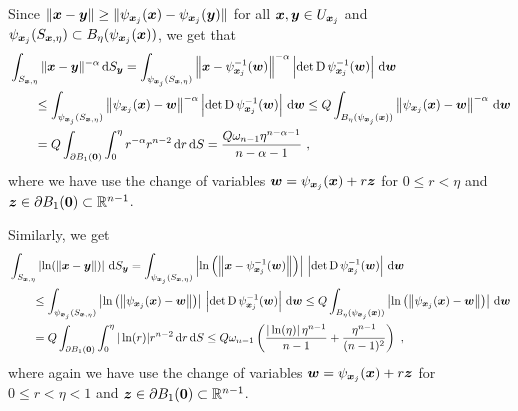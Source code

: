 Since $\displaystyle \|{\bm{x}}-{\bm{y}}\| 
\geq \|\psi_{{\bm{x}}_j}({\bm{x}}) - \psi_{{\bm{x}}_j}({\bm{y}})\|$ for all
$\displaystyle {\bm{x}},{\bm{y}} \in U_{{\bm{x}}_j}$ and
$\displaystyle \psi_{{\bm{x}}_j}(S_{{\bm{x}},\eta}) \subset
B_{\eta}(\psi_{{\bm{x}}_j}({\bm{x}}))$, we get that
\begin{align*}
&\int_{S_{{\bm{x}},\eta}} \|{\bm{x}}-{\bm{y}}\|^{-\alpha} \,\mathrm{d}{S}_{{\bm{y}}}
= \int_{\psi_{{\bm{x}}_j}(S_{{\bm{x}},\eta})}
\left\|{\bm{x}}-\psi_{{\bm{x}}_j}^{-1}({\bm{w}})\right\|^{-\alpha}
\left| \det \operatorname{D} \psi_{{\bm{x}}_j}^{-1}({\bm{w}})\right| \,\mathrm{d}{{\bm{w}}} \\
& \qquad
\leq \int_{\psi_{{\bm{x}}_j}(S_{{\bm{x}},\eta})}
\left\|\psi_{{\bm{x}}_j}({\bm{x}})-{\bm{w}}\right\|^{-\alpha}
\left| \det \operatorname{D} \psi_{{\bm{x}}_j}^{-1}({\bm{w}})\right| \,\mathrm{d}{{\bm{w}}}
\leq Q \int_{B_{\eta}(\psi_{{\bm{x}}_j}({\bm{x}}))}
\left\|\psi_{{\bm{x}}_j}({\bm{x}})-{\bm{w}}\right\|^{-\alpha} \,\mathrm{d}{{\bm{w}}} \\
&\qquad
= Q \int_{\partial B_1({\bm{0}})} \int_0^\eta r^{-\alpha}
r^{n-2} \,\mathrm{d}{r} \,\mathrm{d}{S}
= \frac{ Q \omega_{n-1} \eta^{n-\alpha-1}}{n-\alpha -1} \ ,
\end{align*}
where we have use the change of variables
${\bm{w}} = \psi_{{\bm{x}}_j}({\bm{x}}) + r {\bm{z}}$ for
$0 \leq r < \eta$ and ${\bm{z}} \in \partial B_1({\bm{0}}) \subset \mathbb{R}^{n-1}$.

Similarly, we get
\begin{align*}
&\int_{S_{{\bm{x}},\eta}} \left|\ln(\|{\bm{x}}-{\bm{y}}\|)\right| \,\mathrm{d}{S}_{{\bm{y}}}
= \int_{\psi_{{\bm{x}}_j}(S_{{\bm{x}},\eta})}
\left| \ln\left(\left\|{\bm{x}}
-\psi_{{\bm{x}}_j}^{-1}({\bm{w}})\right\|\right)\right| \,
\left| \det \operatorname{D} \psi_{{\bm{x}}_j}^{-1}({\bm{w}})\right| \,\mathrm{d}{{\bm{w}}} \\
& \qquad
\leq \int_{\psi_{{\bm{x}}_j}(S_{{\bm{x}},\eta})}
\left| \ln\left( \left\|\psi_{{\bm{x}}_j}({\bm{x}})-{\bm{w}}\right\|\right)\right|
\, \left| \det \operatorname{D} \psi_{{\bm{x}}_j}^{-1}({\bm{w}})\right| \,\mathrm{d}{{\bm{w}}}
\leq Q \int_{B_{\eta}(\psi_{{\bm{x}}_j}({\bm{x}}))}
\left|\ln\left( \left\|\psi_{{\bm{x}}_j}({\bm{x}})-{\bm{w}}\right\|\right)\right|
\,\mathrm{d}{{\bm{w}}} \\
&\qquad
= Q \int_{\partial B_1({\bm{0}})} \int_0^\eta |\ln(r)|
  r^{n-2} \,\mathrm{d}{r} \,\mathrm{d}{S}
\leq Q \omega_{n-1} \left( \frac{|\ln(\eta)|\, \eta^{n-1}}{n-1}  +
  \frac{\eta^{n-1}}{(n-1)^2}  \right) \ ,
\end{align*}
where again we have use the change of variables 
${\bm{w}} = \psi_{{\bm{x}}_j}({\bm{x}}) + r {\bm{z}}$ for
$0 \leq r < \eta <1$ and
${\bm{z}} \in \partial B_1({\bm{0}}) \subset \mathbb{R}^{n-1}$.

